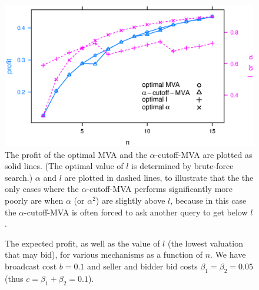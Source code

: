 \begin{figure}
\centering
    \includegraphics[width=\linewidth]{figures/cutoff_.2_.1_15.eps}
    \caption{The profit of the optimal MVA and the $\alpha$-cutoff-MVA are plotted as
    solid lines.  (The optimal value of $l$ is determined by brute-force
    search.)  $\alpha$ and $l$ are plotted in dashed lines, to illustrate
    that the the only cases where the $\alpha$-cutoff-MVA performs
    significantly more poorly are when $\alpha$ (or $\alpha^2$) are slightly
    above $l$, because in this case the $\alpha$-cutoff-MVA is often forced to
    ask another query to get below $l$.}\label{fig:cutoff}
\end{figure}

\begin{figure}
\centering
  \caption{The expected profit, as well as the value of $l$ (the lowest
    valuation that may bid), for various mechanisms as a function of $n$.
    We have
  broadcast cost $b = 0.1$ and  seller and bidder bid costs $\beta_1 =
  \beta_2 = 0.05$ (thus $c = \beta_1+\beta_2 = 0.1$).}\label{fig:general}
\end{figure}



